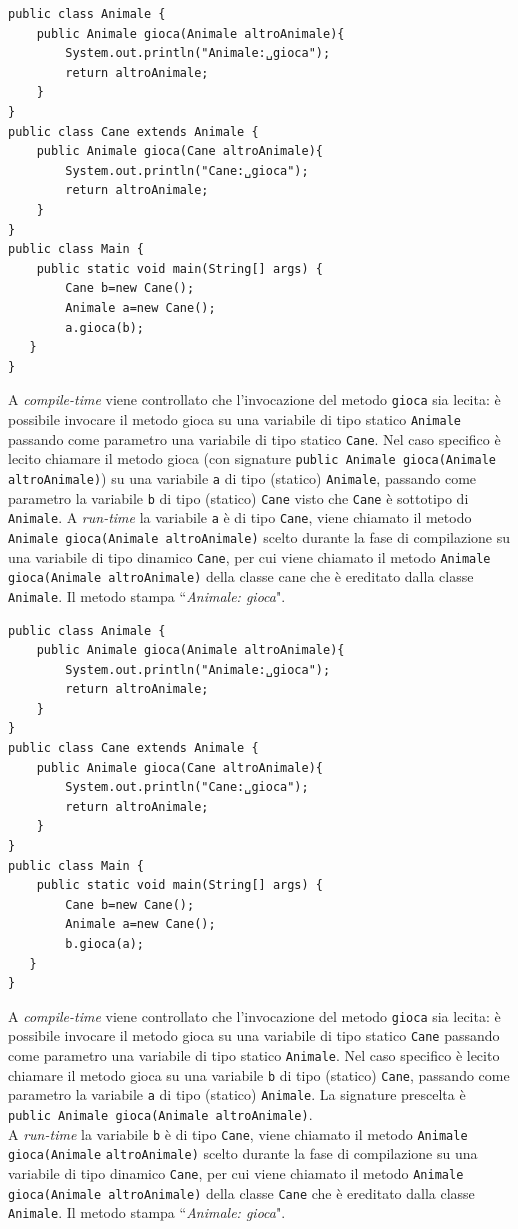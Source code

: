 \documentclass{article}
\begin{document}
\begin{lstlisting}
public class Animale {
    public Animale gioca(Animale altroAnimale){
        System.out.println("Animale:␣gioca"); 
        return altroAnimale;
    }
}
public class Cane extends Animale {
    public Animale gioca(Cane altroAnimale){ 
        System.out.println("Cane:␣gioca"); 
        return altroAnimale;
    }
}
public class Main {
    public static void main(String[] args) { 
        Cane b=new Cane();
        Animale a=new Cane();
        a.gioca(b);
   } 
}
\end{lstlisting}
A \emph{compile-time} viene controllato che l'invocazione del metodo \texttt{gioca} sia lecita: \`e possibile invocare il metodo gioca su una variabile di tipo statico \texttt{Animale} passando come parametro una variabile di tipo statico \texttt{Cane}. Nel caso specifico \`e lecito chiamare il metodo gioca (con signature \texttt{public Animale gioca(Animale altroAnimale)}) su una variabile \texttt{a} di tipo (statico) \texttt{Animale}, passando come parametro la variabile \texttt{b} di tipo (statico) \texttt{Cane} visto che \texttt{Cane} \`e sottotipo di \texttt{Animale}. A \emph{run-time} la variabile \texttt{a} \`e di tipo \texttt{Cane}, viene chiamato il metodo \texttt{Animale gioca(Animale altroAnimale)} scelto durante la fase di compilazione su una variabile di tipo dinamico \texttt{Cane}, per cui viene chiamato il metodo \texttt{Animale gioca(Animale altroAnimale)} della classe cane che \`e ereditato dalla classe \texttt{Animale}. Il metodo stampa ``\textit{Animale: gioca}".

\begin{lstlisting}
public class Animale {
    public Animale gioca(Animale altroAnimale){
        System.out.println("Animale:␣gioca");
        return altroAnimale; 
    }
}
public class Cane extends Animale { 
    public Animale gioca(Cane altroAnimale){
        System.out.println("Cane:␣gioca");
        return altroAnimale; 
    }
}
public class Main {
    public static void main(String[] args) {
        Cane b=new Cane(); 
        Animale a=new Cane(); 
        b.gioca(a);
   } 
}
\end{lstlisting}
A \emph{compile-time} viene controllato che l'invocazione del metodo \texttt{gioca} sia lecita: \`e possibile invocare il metodo gioca su una variabile di tipo statico \texttt{Cane} passando come parametro una variabile di tipo statico \texttt{Animale}. Nel caso specifico \`e lecito chiamare il metodo gioca su una variabile \texttt{b} di tipo (statico) \texttt{Cane}, passando come parametro la variabile \texttt{a} di tipo (statico) \texttt{Animale}.
La signature prescelta \`e \texttt{public Animale gioca(Animale altroAnimale)}. \\
A \emph{run-time} la variabile \texttt{b} \`e di tipo \texttt{Cane}, viene chiamato il metodo \texttt{Animale gioca(Animale} \texttt{altroAnimale)} scelto durante la fase di compilazione su una variabile di tipo dinamico \texttt{Cane}, per cui viene chiamato il metodo \texttt{Animale gioca(Animale altroAnimale)} della classe \texttt{Cane} che \`e ereditato dalla classe \texttt{Animale}. Il metodo stampa ``\textit{Animale: gioca}".
\end{document}
